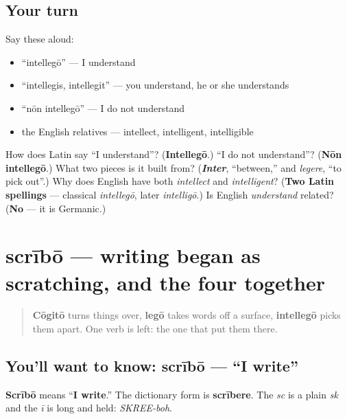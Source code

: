 \subsection*{Your turn}
Say these aloud:

\begin{itemize}
\raggedright
  \item \textquotedblleft{}intellegō\textquotedblright{} — I understand
  \item \textquotedblleft{}intellegis, intellegit\textquotedblright{} — you understand, he or she understands
  \item \textquotedblleft{}nōn intellegō\textquotedblright{} — I do not understand
  \item the English relatives — intellect, intelligent, intelligible
\end{itemize}

\begin{tcolorbox}[breakable,colback=teal!4,colframe=teal!35!black,title={Before you move on}]
How does Latin say \textquotedblleft{}I understand\textquotedblright{}? (\textbf{Intellegō}.) \textquotedblleft{}I do not understand\textquotedblright{}? (\textbf{Nōn intellegō}.) What two pieces is it built from? (\emph{\textbf{Inter}}, \textquotedblleft{}between,\textquotedblright{} and \emph{legere}, \textquotedblleft{}to pick out\textquotedblright{}.) Why does English have both \emph{intellect} and \emph{intelligent}? (\textbf{Two Latin spellings} — classical \emph{intellegō}, later \emph{intelligō}.) Is English \emph{understand} related? (\textbf{No} — it is Germanic.)
\end{tcolorbox}
\section[scrībō, scrībere]{scrībō — writing began as scratching, and the four together}

\label{lesson:LA-C38-scribo}



\begin{quote}
\textbf{Cōgitō} turns things over, \textbf{legō} takes words off a surface, \textbf{intellegō} picks them apart. One verb is left: the one that put them there.
\end{quote}

\subsection*{You'll want to know: scrībō — \textquotedblleft{}I write\textquotedblright{}}
\textbf{Scrībō} means \textquotedblleft{}\textbf{I write}.\textquotedblright{} The dictionary form is \textbf{scrībere}. The \emph{sc} is a plain \emph{sk} and the \emph{ī} is long and held: \emph{SKREE-boh}.

